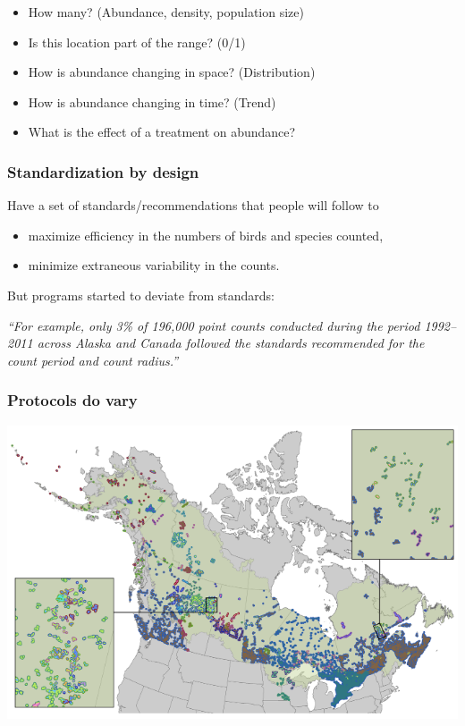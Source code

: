 \documentclass[12pt,]{book}
\providecommand{\tightlist}{%
  \setlength{\itemsep}{0pt}\setlength{\parskip}{0pt}}
\begin{document}
\begin{itemize}
\tightlist
\item
  How many? (Abundance, density, population size)
\item
  Is this location part of the range? (0/1)
\item
  How is abundance changing in space? (Distribution)
\item
  How is abundance changing in time? (Trend)
\item
  What is the effect of a treatment on abundance?
\end{itemize}

\hypertarget{standardization-by-design}{%
\subsubsection{Standardization by design}\label{standardization-by-design}}

Have a set of standards/recommendations that people will follow to

\begin{itemize}
\tightlist
\item
  maximize efficiency in the numbers of birds and species counted,
\item
  minimize extraneous variability in the counts.
\end{itemize}

But programs started to deviate from standards:

\emph{``For example, only 3\% of 196,000 point counts conducted during the period
1992--2011 across Alaska and Canada followed the standards recommended for the count period and count radius.''}

\hypertarget{protocols-do-vary}{%
\subsubsection{Protocols do vary}\label{protocols-do-vary}}

\includegraphics[width=9.43in]{./images/barker-2015-fig-2}
\end{document}
